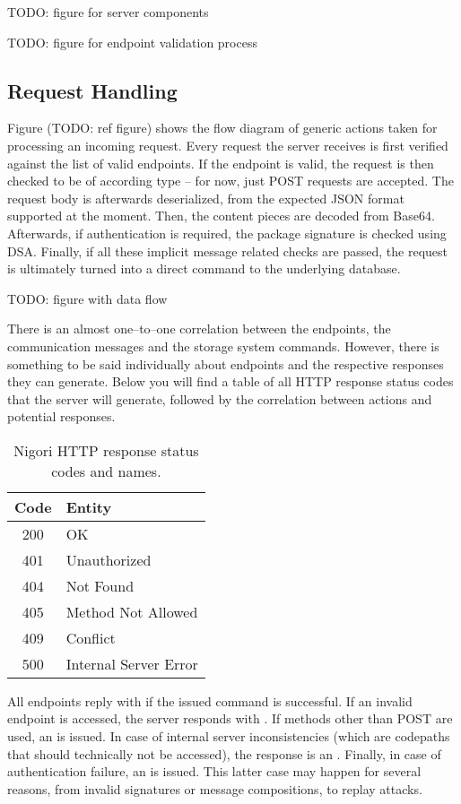 TODO: figure for server components

TODO: figure for endpoint validation process

\subsection{Request Handling}
Figure (TODO: ref figure) shows the flow diagram of generic actions taken for processing an incoming request.
Every request the server receives is first verified against the list of valid endpoints.
If the endpoint is valid, the request is then checked to be of according type -- for now, just POST requests are accepted.
The request body is afterwards deserialized, from the expected JSON format supported at the moment.
Then, the content pieces are decoded from Base64.
Afterwards, if authentication is required, the package signature is checked using DSA.
Finally, if all these implicit message related checks are passed, the request is ultimately turned into a direct command to the underlying database.

TODO: figure with data flow

There is an almost one--to--one correlation between the endpoints, the communication messages and the storage system commands.
However, there is something to be said individually about endpoints and the respective responses they can generate.
Below you will find a table of all HTTP response status codes that the server will generate, followed by the correlation between actions and potential responses.

\begin{table}[H]
  \centering
  \begin{tabular}{ | c | l | }
    \hline
    \textbf{Code} & \textbf{Entity} \\ \hline
  \hline
    200 & OK \\ \hline
    401 & Unauthorized \\ \hline
    404 & Not Found \\ \hline
    405 & Method Not Allowed \\ \hline
    409 & Conflict \\ \hline
    500 & Internal Server Error \\ \hline
  \end{tabular}
  \caption{Nigori HTTP response status codes and names.}
\end{table}

All endpoints reply with  if the issued command is successful.
If an invalid endpoint is accessed, the server responds with .
If methods other than POST are used, an  is issued.
In case of internal server inconsistencies (which are codepaths that should technically not be accessed), the response is an .
Finally, in case of authentication failure, an  is issued.
This latter case may happen for several reasons, from invalid signatures or message compositions, to replay attacks.

